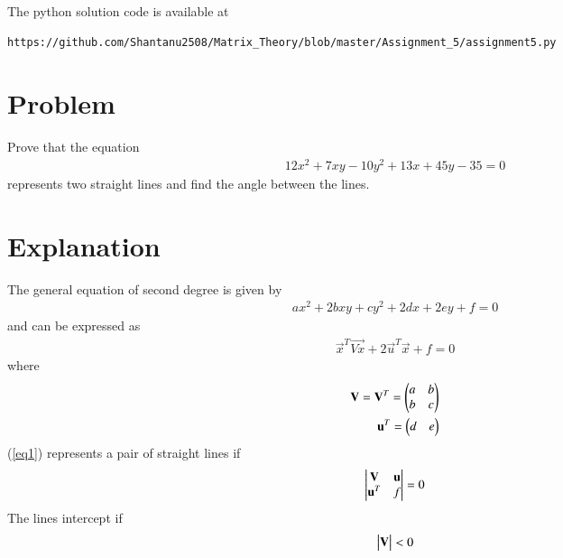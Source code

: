 \documentclass[journal,12pt,twocolumn]{IEEEtran}
\begin{document}
The python solution code is available at
\begin{lstlisting}
https://github.com/Shantanu2508/Matrix_Theory/blob/master/Assignment_5/assignment5.py
\end{lstlisting}

\section{Problem}
Prove that the equation
\begin{align*}
	12x^2 + 7xy -10y^2 +13x +45y -35 =0 
\end{align*}
represents two straight lines and find the angle between the lines.
\section{Explanation}
The general equation of second degree is given by
\begin{align}
	ax^2 + 2bxy +cy^2 +2dx +2ey +f =0            \label{eq1}
\end{align}
and can be expressed as
\begin{align}
	\vec{x}^{T}\vec{Vx} + 2\vec{u}^{T}\vec{x} + f=0   \label{eq2}
\end{align}
where
\begin{align}
	\vec{V}=\vec{V}^T=\myvec{a & b \\ b & c}   \label{eq3}  \\
	\vec{u}^T=\myvec{d &  e}            \label{eq4}
\end{align}
(\ref{eq1}) represents a pair of straight lines if
\begin{align}
	\mydet{\vec{V} & \vec{u} \\ \vec{u}^T & f} = 0     \label{eq5} 
\end{align}
The lines intercept if
\begin{align}
	\begin{vmatrix}\mathbf{V}\end{vmatrix} < 0
\end{align}
\end{document}

